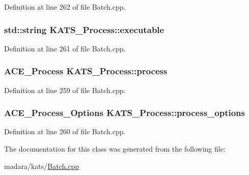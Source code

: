 Definition at line 262 of file Batch.cpp.

\hypertarget{classKATS__Process_ad3d481ebf6551b3c126b991b4e2dd915}{
\subsubsection[{executable}]{\setlength{\rightskip}{0pt plus 5cm}std::string {\bf KATS\_\-Process::executable}}}
\label{d5/ddc/classKATS__Process_ad3d481ebf6551b3c126b991b4e2dd915}


Definition at line 261 of file Batch.cpp.

\hypertarget{classKATS__Process_a6ba77ef0f8e4c11cc023c58e3644d5a9}{
\subsubsection[{process}]{\setlength{\rightskip}{0pt plus 5cm}ACE\_\-Process {\bf KATS\_\-Process::process}}}
\label{d5/ddc/classKATS__Process_a6ba77ef0f8e4c11cc023c58e3644d5a9}


Definition at line 259 of file Batch.cpp.

\hypertarget{classKATS__Process_a8b87574deae87e421b23fe0ccb1519ad}{
\subsubsection[{process\_\-options}]{\setlength{\rightskip}{0pt plus 5cm}ACE\_\-Process\_\-Options {\bf KATS\_\-Process::process\_\-options}}}
\label{d5/ddc/classKATS__Process_a8b87574deae87e421b23fe0ccb1519ad}


Definition at line 260 of file Batch.cpp.



The documentation for this class was generated from the following file:\begin{DoxyCompactItemize}
\item 
madara/kats/\hyperlink{Batch_8cpp}{Batch.cpp}\end{DoxyCompactItemize}
